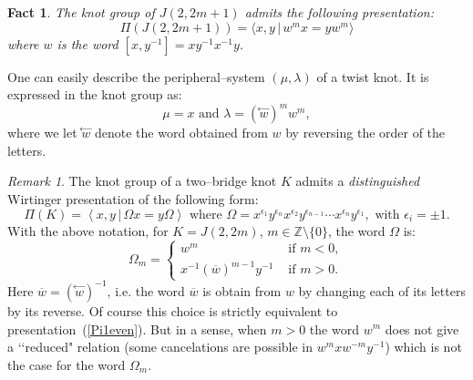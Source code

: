 \documentclass[a4paper]{amsart}
\theoremstyle{plain}
\newtheorem{fact}[theorem]{Fact}
\theoremstyle{definition}
\theoremstyle{remark}
\newtheorem{remark}{Remark}%
\newcommand{\ZZ}{{\mathbb Z}}
\begin{document}
\begin{fact}\label{Fact2}
The knot group of $J(2, 2m+1)$ admits the following presentation:
\begin{equation}\label{Pi1odd}
\Pi(J(2, 2m+1))
=
\langle
x, y \,|\, w^{m} x = y w^{m}
\rangle
\end{equation}
where $w$ is the word $[x,y^{-1}] = xy^{-1}x^{-1}y$.
\end{fact}

One can easily describe the peripheral--system $(\mu, \lambda)$ of a twist knot.
It is expressed in the knot group as:
\[
\mu = x \text{ and } \lambda = (\stackrel{\gets}{w})^m w^m,
\]
where we let $\stackrel{\gets}{w}$ denote the word obtained from $w$ by reversing the order of the letters.

\begin{remark}\label{wordtwistknot}
The knot group of a two--bridge knot $K$ admits a {\emph{distinguished}} Wirtinger presentation of the following form:
\begin{equation*}%
\Pi(K)=\left\langle {x,y \, | \, \Omega x=y\Omega} \right\rangle  \text{ where } \Omega=x^{\epsilon_1}y^{\epsilon_n}x^{\epsilon_2}y^{\epsilon_{n-1}}\dotsb x^{\epsilon_n}y^{\epsilon_1}, \text{ with } \epsilon_i = \pm 1.
\end{equation*}
With the above notation, for $K = J(2, 2m)$, $m \in \ZZ \setminus \{0\}$, the word $\Omega$ is: 
\begin{equation}\label{word}
\Omega_m = \begin{cases}
     w^m & \text{ if } m < 0, \\
      x^{-1} {(\overline{w})}^{m-1} y^{-1} & \text{ if } m > 0.
\end{cases}
\end{equation}
Here $\overline{w} = {(\stackrel{\gets}{w})}^{-1}$, i.e. the word $\overline{w}$ is obtain from $w$ by changing each of its letters by its reverse. Of course this choice is strictly equivalent to presentation~(\ref{Pi1even}). But in a sense, when $m>0$ the word $w^m$ does not give a \lq\lq reduced" relation (some cancelations are possible in $w^mxw^{-m}y^{-1}$) which is not the case for {the word} $\Omega_m$.
\end{remark}
\end{document}
